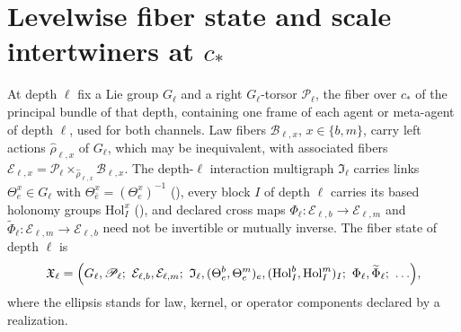 \section{Levelwise fiber state and scale intertwiners at \texorpdfstring{$c_*$}{c*}}
\label{sec:rg-common-principal-state}

At depth $\ell$ fix a Lie group $G_\ell$ and a right $G_\ell$-torsor $\mathscr P_\ell$, the fiber over $c_*$
of the principal bundle of that depth, containing one frame of each agent or meta-agent of depth $\ell$,
used for both channels. Law fibers $\mathcal B_{\ell,x}$, $x\in\{b,m\}$, carry left actions
$\widehat\rho_{\ell,x}$ of $G_\ell$, which may be inequivalent, with associated fibers
$\mathcal E_{\ell,x}=\mathscr P_\ell\times_{\widehat\rho_{\ell,x}}\mathcal B_{\ell,x}$. The depth-$\ell$
interaction multigraph $\mathfrak I_\ell$ carries links $\Theta^x_e\in G_\ell$ with
$\Theta^x_{\bar e}=(\Theta^x_e)^{-1}$ (), every block $I$ of depth $\ell$ carries
its based holonomy groups $\mathrm{Hol}^x_I$ (), and declared cross maps
$\Phi_\ell:\mathcal E_{\ell,b}\to\mathcal E_{\ell,m}$ and $\widetilde\Phi_\ell:\mathcal E_{\ell,m}\to\mathcal E_{\ell,b}$
need not be invertible or mutually inverse. The fiber state of depth $\ell$ is
\begin{equation}
\mathfrak X_\ell=\Bigl(G_\ell,\mathscr P_\ell;\ \mathcal E_{\ell,b},\mathcal E_{\ell,m};\
\mathfrak I_\ell,(\Theta^b_e,\Theta^m_e)_e,(\mathrm{Hol}^b_I,\mathrm{Hol}^m_I)_I;\
\Phi_\ell,\widetilde\Phi_\ell;\ \ldots\Bigr),
\label{eq:rg-full-state}
\end{equation}
where the ellipsis stands for law, kernel, or operator components declared by a realization.

